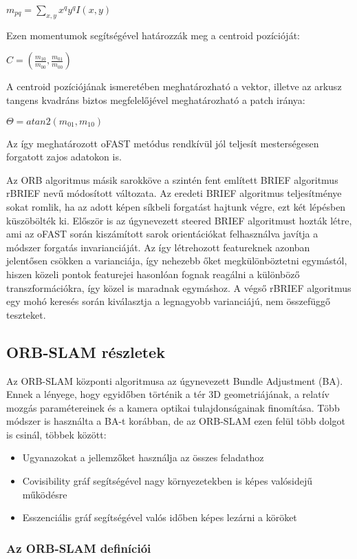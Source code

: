 $ m_{pq} = \sum_{x,y}^{}x^{q}y^{q}I(x,y) $

Ezen momentumok segítségével határozzák meg a centroid pozícióját:

$ C = (\frac{m_{10}}{m_{00}},\frac{m_{01}}{m_{00}}) $

A centroid pozíciójának ismeretében meghatározható a vektor, illetve az arkusz tangens kvadráns biztos megfelelőjével meghatározható a patch iránya:

$ \Theta = atan2(m_{01},m_{10}) $

Az így meghatározott oFAST metódus rendkívül jól teljesít mesterségesen forgatott zajos adatokon is.

Az ORB algoritmus másik sarokköve a szintén fent említett BRIEF algoritmus rBRIEF nevű módosított változata.
Az eredeti BRIEF algoritmus teljesítménye sokat romlik, ha az adott képen síkbeli forgatást hajtunk végre, ezt két lépésben küszöbölték ki.
Először is az úgynevezett steered BRIEF algoritmust hozták létre, ami az oFAST során kiszámított sarok orientációkat felhasználva javítja a módszer forgatás invarianciáját.
Az így létrehozott featureknek azonban jelentősen csökken a varianciája, így nehezebb őket megkülönböztetni egymástól, hiszen közeli pontok featurejei hasonlóan fognak reagálni a különböző transzformációkra, így közel is maradnak egymáshoz.
A végső rBRIEF algoritmus egy mohó keresés során kiválasztja a legnagyobb varianciájú, nem összefüggő teszteket.

\subsection{ORB-SLAM részletek}

Az ORB-SLAM központi algoritmusa az úgynevezett Bundle Adjustment (BA). 
Ennek a lényege, hogy egyidőben történik a tér 3D geometriájának, a relatív mozgás paramétereinek és a kamera optikai tulajdonságainak finomítása.
Több módszer is használta a BA-t korábban, de az ORB-SLAM ezen felül több dolgot is csinál, többek között: 
\begin{itemize}
	\item Ugyanazokat a jellemzőket használja az összes feladathoz
	\item Covisibility gráf segítségével nagy környezetekben is képes valósidejű működésre
	\item Esszenciális gráf segítségével valós időben képes lezárni a köröket
\end{itemize}

\subsubsection{Az ORB-SLAM definíciói}

